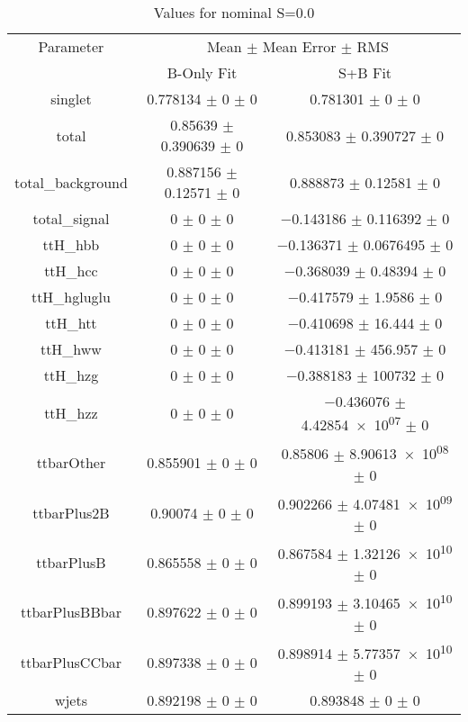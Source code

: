 \begin{table}
\centering
\caption{Values for nominal S=0.0}
\begin{tabular}{ccc}
\toprule
Parameter & \multicolumn{2}{c}{Mean $\pm$ Mean Error $\pm$ RMS}\\
 & B-Only Fit & S+B Fit\\
\midrule
singlet & \num{0.778134} $\pm$ \num{0} $\pm$ \num{0} & \num{0.781301} $\pm$ \num{0} $\pm$ \num{0}\\
total & \num{0.85639} $\pm$ \num{0.390639} $\pm$ \num{0} & \num{0.853083} $\pm$ \num{0.390727} $\pm$ \num{0}\\
total\_background & \num{0.887156} $\pm$ \num{0.12571} $\pm$ \num{0} & \num{0.888873} $\pm$ \num{0.12581} $\pm$ \num{0}\\
total\_signal & \num{0} $\pm$ \num{0} $\pm$ \num{0} & \num{-0.143186} $\pm$ \num{0.116392} $\pm$ \num{0}\\
ttH\_hbb & \num{0} $\pm$ \num{0} $\pm$ \num{0} & \num{-0.136371} $\pm$ \num{0.0676495} $\pm$ \num{0}\\
ttH\_hcc & \num{0} $\pm$ \num{0} $\pm$ \num{0} & \num{-0.368039} $\pm$ \num{0.48394} $\pm$ \num{0}\\
ttH\_hgluglu & \num{0} $\pm$ \num{0} $\pm$ \num{0} & \num{-0.417579} $\pm$ \num{1.9586} $\pm$ \num{0}\\
ttH\_htt & \num{0} $\pm$ \num{0} $\pm$ \num{0} & \num{-0.410698} $\pm$ \num{16.444} $\pm$ \num{0}\\
ttH\_hww & \num{0} $\pm$ \num{0} $\pm$ \num{0} & \num{-0.413181} $\pm$ \num{456.957} $\pm$ \num{0}\\
ttH\_hzg & \num{0} $\pm$ \num{0} $\pm$ \num{0} & \num{-0.388183} $\pm$ \num{100732} $\pm$ \num{0}\\
ttH\_hzz & \num{0} $\pm$ \num{0} $\pm$ \num{0} & \num{-0.436076} $\pm$ \num{4.42854e+07} $\pm$ \num{0}\\
ttbarOther & \num{0.855901} $\pm$ \num{0} $\pm$ \num{0} & \num{0.85806} $\pm$ \num{8.90613e+08} $\pm$ \num{0}\\
ttbarPlus2B & \num{0.90074} $\pm$ \num{0} $\pm$ \num{0} & \num{0.902266} $\pm$ \num{4.07481e+09} $\pm$ \num{0}\\
ttbarPlusB & \num{0.865558} $\pm$ \num{0} $\pm$ \num{0} & \num{0.867584} $\pm$ \num{1.32126e+10} $\pm$ \num{0}\\
ttbarPlusBBbar & \num{0.897622} $\pm$ \num{0} $\pm$ \num{0} & \num{0.899193} $\pm$ \num{3.10465e+10} $\pm$ \num{0}\\
ttbarPlusCCbar & \num{0.897338} $\pm$ \num{0} $\pm$ \num{0} & \num{0.898914} $\pm$ \num{5.77357e+10} $\pm$ \num{0}\\
wjets & \num{0.892198} $\pm$ \num{0} $\pm$ \num{0} & \num{0.893848} $\pm$ \num{0} $\pm$ \num{0}\\
\bottomrule
\end{tabular}
\end{table}